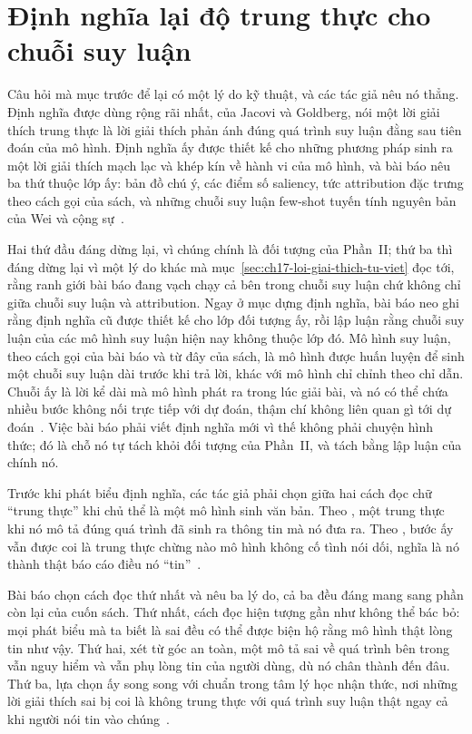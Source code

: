 \section{Định nghĩa lại độ trung thực cho chuỗi suy luận}
\label{sec:ch09-dinh-nghia-lai}

%
%
Câu hỏi mà mục trước để lại có một lý do kỹ thuật, và các tác giả nêu nó
thẳng. Định nghĩa được dùng rộng rãi nhất, của Jacovi và Goldberg, nói một lời
giải thích trung thực là lời giải thích phản ánh đúng quá trình suy luận đằng
sau tiên đoán của mô hình. Định nghĩa ấy được thiết kế cho những phương pháp
sinh ra một lời giải thích mạch lạc và khép kín về hành vi của mô hình, và bài
báo nêu ba thứ thuộc lớp ấy: bản đồ chú ý, các điểm số saliency, tức
attribution đặc trưng theo cách gọi của sách, và những chuỗi suy luận few-shot
tuyến tính nguyên bản của Wei và cộng sự~\autocite{p21metrics}.

Hai thứ đầu đáng dừng lại, vì chúng chính là đối tượng của Phần~II; thứ ba thì
đáng dừng lại vì một lý do khác mà mục~\ref{sec:ch17-loi-giai-thich-tu-viet} đọc
tới, rằng ranh giới bài báo đang vạch chạy cả bên trong chuỗi suy luận chứ không
chỉ giữa chuỗi suy luận và attribution. Ngay ở
mục dựng định nghĩa, bài báo neo ghi rằng định nghĩa cũ được thiết kế cho lớp
đối tượng ấy, rồi lập luận rằng chuỗi suy luận của các mô hình suy luận hiện
nay không thuộc lớp đó. Mô hình suy luận, theo cách gọi của bài báo và từ đây
của sách, là mô hình được huấn luyện để sinh một chuỗi suy luận dài trước khi
trả lời, khác với mô hình chỉ chỉnh theo chỉ dẫn. Chuỗi ấy là lời kể dài mà mô
hình phát ra trong lúc giải bài, và nó có thể chứa nhiều bước không nối trực
tiếp với dự đoán, thậm chí không liên quan gì tới dự
đoán~\autocite{p21metrics}. Việc bài báo phải
viết định nghĩa mới vì thế không phải chuyện hình thức; đó là chỗ nó tự tách
khỏi đối tượng của Phần~II, và tách bằng lập luận của chính nó.

Trước khi phát biểu định nghĩa, các tác giả phải chọn giữa hai cách đọc chữ
\enquote{trung thực} khi chủ thể là một mô hình sinh văn bản. Theo
, một 
trung thực khi nó mô tả đúng quá trình đã sinh ra thông tin mà nó đưa ra. Theo
, bước ấy vẫn được coi là
trung thực chừng nào mô hình không cố tình nói dối, nghĩa là nó thành thật báo
cáo điều nó \enquote{tin}~\autocite{p21metrics}.

Bài báo chọn cách đọc thứ nhất và nêu ba lý do, cả ba đều đáng mang sang phần
còn lại của cuốn sách. Thứ nhất, cách đọc hiện tượng gần như không thể bác bỏ:
mọi phát biểu mà ta biết là sai đều có thể được biện hộ rằng mô hình thật lòng
tin như vậy. Thứ hai, xét từ góc an toàn, một mô tả sai về quá trình bên trong
vẫn nguy hiểm và vẫn phụ lòng tin của người dùng, dù nó chân thành đến đâu.
Thứ ba, lựa chọn ấy song song với chuẩn trong tâm lý học nhận thức, nơi những
lời giải thích sai bị coi là không trung thực với quá trình suy luận thật ngay
cả khi người nói tin vào chúng~\autocite{p21metrics}.

